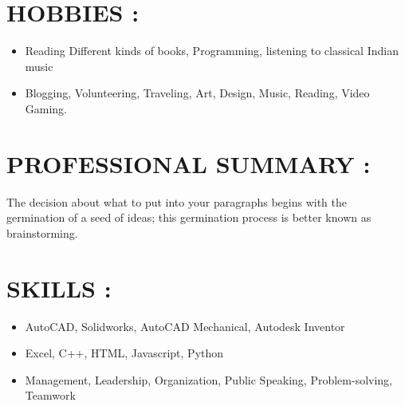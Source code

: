 \documentclass{article}
\begin{document}
{\begin{minipage}[t]{0.45\textwidth}
{}
\vspace{5pt}


\section*{\large{\uppercase{Hobbies :}}}

\begin{flushleft}
\begin{itemize}[noitemsep,nolistsep]
	\item Reading Different kinds of books, Programming, listening to classical Indian music
	\item Blogging, Volunteering, Traveling, Art, Design, Music, Reading, Video Gaming.
\end{itemize}
\end{flushleft}
\vspace{5pt}
\end{minipage}%
\hfill
\begin{minipage}[t]{0.5\textwidth}
\section*{\large{\uppercase{Professional Summary :}}}

\begin{flushleft}
The decision about what to put into your paragraphs begins with the germination of a seed of ideas; this germination process is better known as brainstorming. 
\end{flushleft}

\vspace{3pt}
\section*{\large{\uppercase{Skills :}}}

\begin{flushleft}
\begin{itemize}[noitemsep,nolistsep]
	\item AutoCAD, Solidworks, AutoCAD Mechanical, Autodesk Inventor
	\item Excel, C++, HTML, Javascript, Python
	\item Management, Leadership, Organization, Public Speaking, Problem-solving, Teamwork
\end{itemize}
\end{flushleft}
\vspace{5pt}

\end{minipage}}
\end{document}
